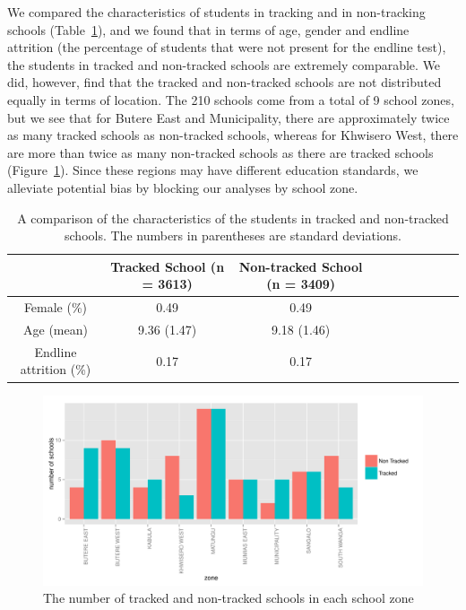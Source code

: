 \documentclass[11pt]{article}
\begin{document}
 We compared the characteristics of students in tracking and in non-tracking schools (Table~\ref{tab:char}), and we found that in terms of age, gender and endline attrition (the percentage of students that were not present for the endline test), the students in tracked and non-tracked schools are extremely comparable. We did, however, find that the tracked and non-tracked schools are not distributed equally in terms of location. The 210 schools come from a total of 9 school zones, but we see that for Butere East and Municipality, there are approximately twice as many tracked schools as non-tracked schools, whereas for Khwisero West, there are more than twice as many non-tracked schools as there are tracked schools (Figure~\ref{fig:zone}).  Since these regions may have different education standards, we alleviate potential bias by blocking our analyses by school zone.
 
 \begin{table}[H]
 \centering
 \begin{tabular}{cccccccccc}
 \hline
 & Tracked School (n = 3613) & Non-tracked School (n = 3409)\\
 \hline
Female (\%) & 0.49 & 0.49\\
Age (mean) & 9.36 (1.47) & 9.18 (1.46)\\
Endline attrition (\%) & 0.17 & 0.17\\ \hline
 \end{tabular}
 \caption{A comparison of the characteristics of the students in tracked and non-tracked schools. The numbers in parentheses are standard deviations.}
 \label{tab:char}
 \end{table} 
 
 \begin{figure}[H]
 \centering
 \includegraphics[scale = 0.6]{school_zones.pdf}
 \caption{The number of tracked and non-tracked schools in each school zone}
 \label{fig:zone}
 \end{figure}
 
\end{document}
